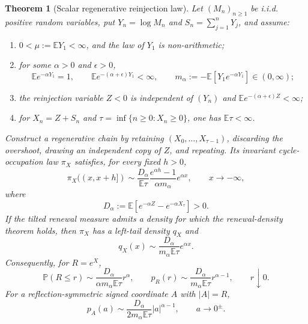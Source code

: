 \documentclass[11pt]{article}
\newtheorem{theorem}{Theorem}
\theoremstyle{definition}
\newcommand{\E}{\mathbb E}
\newcommand{\Pp}{\mathbb P}
\begin{document}
\begin{theorem}[Scalar regenerative reinjection law]
\label{thm:scalar-reinjection}
Let $(M_n)_{n\geq1}$ be i.i.d. positive random variables, put
$Y_n=\log M_n$ and $S_n=\sum_{j=1}^nY_j$, and assume:
\begin{enumerate}[label=(\roman*),leftmargin=2.2em]
  \item $0<\mu:=\E Y_1<\infty$, and the law of $Y_1$ is non-arithmetic;
  \item for some $\alpha>0$ and $\epsilon>0$,
  \begin{equation}
     \E e^{-\alpha Y_1}=1,
     \qquad \E e^{-(\alpha+\epsilon)Y_1}<\infty,
     \qquad
     m_\alpha:=-\E[Y_1e^{-\alpha Y_1}]\in(0,\infty);
     \label{eq:scalar-cramer-assumptions}
  \end{equation}
  \item the reinjection variable $Z<0$ is independent of $(Y_n)$ and
  $\E e^{-(\alpha+\epsilon)Z}<\infty$;
  \item for $X_n=Z+S_n$ and
  $\tau=\inf\{n\geq0:X_n\geq0\}$, one has $\E\tau<\infty$.
\end{enumerate}
Construct a regenerative chain by retaining
$(X_0,\ldots,X_{\tau-1})$, discarding the overshoot, drawing an independent
copy of $Z$, and repeating.  Its invariant cycle-occupation law $\pi_X$
satisfies, for every fixed $h>0$,
\begin{equation}
 \pi_X((x,x+h])
 \sim
 \frac{D_\alpha}{\E\tau}
 \frac{e^{\alpha h}-1}{\alpha m_\alpha}e^{\alpha x},
 \qquad x\to-\infty,
 \label{eq:log-reinjection-local-tail}
\end{equation}
where
\begin{equation}
 D_\alpha
 :=\E\!\left[e^{-\alpha Z}-e^{-\alpha X_\tau}\right]>0.
 \label{eq:scalar-reinjection-constant}
\end{equation}
If the tilted renewal measure admits a density for which the renewal-density
theorem holds, then $\pi_X$ has a left-tail density $q_X$ and
\begin{equation}
 q_X(x)\sim
 \frac{D_\alpha}{m_\alpha\E\tau}e^{\alpha x}.
 \label{eq:log-reinjection-density}
\end{equation}
Consequently, for $R=e^X$,
\begin{equation}
 \Pp(R\leq r)\sim
 \frac{D_\alpha}{\alpha m_\alpha\E\tau}r^\alpha,
 \qquad
 p_R(r)\sim
 \frac{D_\alpha}{m_\alpha\E\tau}r^{\alpha-1},
 \qquad r\downarrow0.
 \label{eq:radial-reinjection-density}
\end{equation}
For a reflection-symmetric signed coordinate $A$ with $|A|=R$,
\begin{equation}
 p_A(a)\sim
 \frac{D_\alpha}{2m_\alpha\E\tau}|a|^{\alpha-1},
 \qquad a\to0^\pm.
 \label{eq:signed-reinjection-density}
\end{equation}
\end{theorem}
\end{document}
